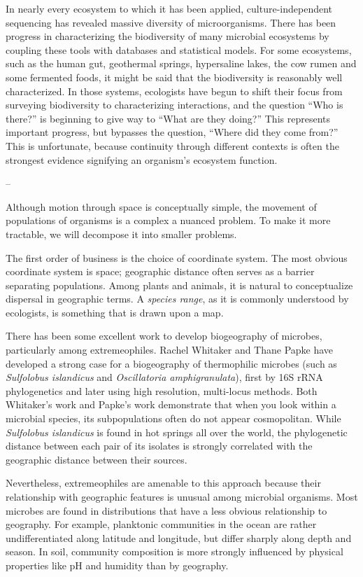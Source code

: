 In nearly every ecosystem to which it has been applied, culture-independent sequencing has revealed massive diversity of microorganisms. There has been progress in characterizing the biodiversity of many microbial ecosystems by coupling these tools with databases and statistical models. For some ecosystems, such as the human gut, geothermal springs, hypersaline lakes, the cow rumen and some fermented foods, it might be said that the biodiversity is reasonably well characterized. In those systems, ecologists have begun to shift their focus from surveying biodiversity to characterizing interactions, and the question ``Who is there?'' is beginning to give way to ``What are they doing?'' This represents important progress, but bypasses the question, ``Where did they come from?'' This is unfortunate, because continuity through different contexts is often the strongest evidence signifying an organism's ecosystem function.

--

Although motion through space is conceptually simple, the movement of populations of organisms is a complex a nuanced problem. To make it more tractable, we will decompose it into smaller problems. 

The first order of business is the choice of coordinate system. The most obvious coordinate system is space; geographic distance often serves as a barrier separating populations. Among plants and animals, it is natural to conceptualize dispersal in geographic terms. A {\em species range}, as it is commonly understood by ecologists, is something that is drawn upon a map. 

There has been some excellent work to develop biogeography of microbes, particularly among extremeophiles. Rachel Whitaker and Thane Papke have developed a strong case for a biogeography of thermophilic microbes (such as {\em Sulfolobus islandicus} and {\em Oscillatoria amphigranulata}), first by 16S rRNA phylogenetics and later using high resolution, multi-locus methods. Both Whitaker's work and Papke's work demonstrate that when you look within a microbial species, its subpopulations often do not appear cosmopolitan. While {\em Sulfolobus islandicus} is found in hot springs all over the world, the phylogenetic distance between each pair of its isolates is strongly correlated with the geographic distance between their sources.

Nevertheless, extremeophiles are amenable to this approach because their relationship with geographic features is unusual among microbial organisms. Most microbes are found in distributions that have a less obvious relationship to geography. For example, planktonic communities in the ocean are rather undifferentiated along latitude and longitude, but differ sharply along depth and season. In soil, community composition is more strongly influenced by physical properties like pH and humidity than by geography.


